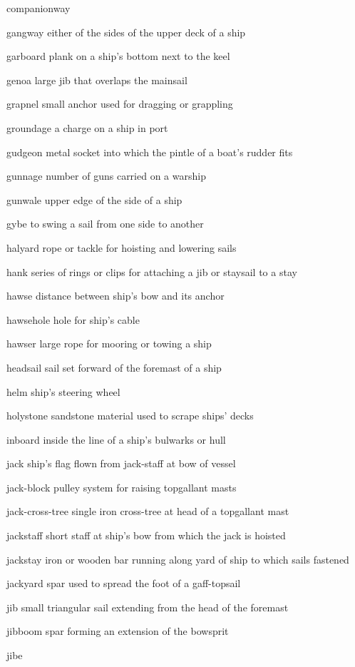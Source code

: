 \documentclass[
  11pt,
  msmallroyalvopaper
]{memoir}
\begin{document}
\begin{labeling}{companionway}
\item[gangway]
either of the sides of the upper deck of a ship
\item[garboard]
plank on a ship's bottom next to the keel
\item[genoa]
large jib that overlaps the mainsail
\item[grapnel]
small anchor used for dragging or grappling
\item[groundage]
a charge on a ship in port
\item[gudgeon]
metal socket into which the pintle of a boat's rudder fits
\item[gunnage]
number of guns carried on a warship
\item[gunwale]
upper edge of the side of a ship
\item[gybe]
to swing a sail from one side to another
\item[halyard]
rope or tackle for hoisting and lowering sails
\item[hank]
series of rings or clips for attaching a jib or staysail to a stay
\item[hawse]
distance between ship's bow and its anchor
\item[hawsehole]
hole for ship's cable
\item[hawser]
large rope for mooring or towing a ship
\item[headsail]
sail set forward of the foremast of a ship
\item[helm]
ship's steering wheel
\item[holystone]
sandstone material used to scrape ships' decks
\item[inboard]
inside the line of a ship's bulwarks or hull
\item[jack]
ship's flag flown from jack-staff at bow of vessel
\item[jack-block]
pulley system for raising topgallant masts
\item[jack-cross-tree]
single iron cross-tree at head of a topgallant mast
\item[jackstaff]
short staff at ship's bow from which the jack is hoisted
\item[jackstay]
iron or wooden bar running along yard of ship to which sails fastened
\item[jackyard]
spar used to spread the foot of a gaff-topsail
\item[jib]
small triangular sail extending from the head of the foremast
\item[jibboom]
spar forming an extension of the bowsprit
\item[jibe]

\end{labeling}
\end{document}
